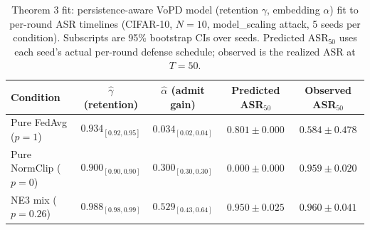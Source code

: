\begin{table}[h]
\caption{Theorem 3 fit: persistence-aware VoPD model (retention $\gamma$, embedding $\alpha$) fit to per-round ASR timelines (CIFAR-10, $N{=}10$, model\_scaling attack, 5 seeds per condition). Subscripts are 95\% bootstrap CIs over seeds. Predicted ASR$_{50}$ uses each seed's actual per-round defense schedule; observed is the realized ASR at $T{=}50$.}
\label{tab:persistence_fit}
\centering\small
\begin{tabular}{lcccc}
\toprule
Condition & $\hat\gamma$ (retention) & $\hat\alpha$ (admit gain) & Predicted ASR$_{50}$ & Observed ASR$_{50}$ \\
\midrule
Pure FedAvg ($p{=}1$) & $0.934_{[0.92,0.95]}$ & $0.034_{[0.02,0.04]}$ & $0.801\pm0.000$ & $0.584\pm0.478$ \\
Pure NormClip ($p{=}0$) & $0.900_{[0.90,0.90]}$ & $0.300_{[0.30,0.30]}$ & $0.000\pm0.000$ & $0.959\pm0.020$ \\
NE3 mix ($p{=}0.26$) & $0.988_{[0.98,0.99]}$ & $0.529_{[0.43,0.64]}$ & $0.950\pm0.025$ & $0.960\pm0.041$ \\
\bottomrule
\end{tabular}
\end{table}